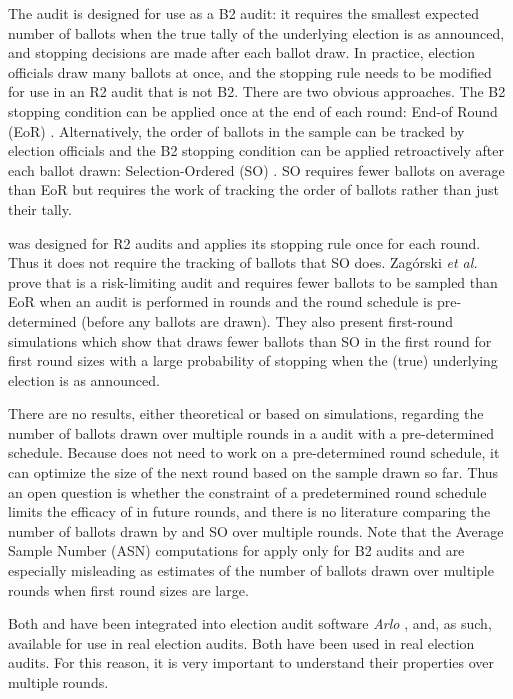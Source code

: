 The \BRAVO audit is designed for use as a B2 audit: it requires the smallest expected number of ballots when the true tally of the underlying election is as announced, and stopping decisions are made after each ballot draw. In practice, election officials draw many ballots at once, and the \BRAVO stopping rule needs to be modified for use in an R2 audit that is not B2. There are two obvious approaches. The B2 stopping condition can be applied once at the end of each round: End-of Round (EoR) \BRAVO.  Alternatively, the order of ballots in the sample can be tracked by election officials and the B2 \BRAVO stopping condition can be applied retroactively after each ballot drawn: Selection-Ordered (SO) \BRAVO. SO \BRAVO requires fewer ballots on average than EoR \BRAVO but requires the work of tracking the order of ballots rather than just their tally.

\Minerva was designed for R2 audits and applies its stopping rule once for each round. Thus it does not require the tracking of ballots that SO \BRAVO does. Zag{\'o}rski {\em et al.} \cite{usenix_minerva} prove that \Minerva is a risk-limiting audit and requires fewer ballots to be sampled than EoR \BRAVO when an audit is performed in rounds and the round schedule is pre-determined (before any ballots are drawn). They also present first-round simulations which show that \Minerva draws fewer ballots than SO \BRAVO in the first round for first round sizes with a large probability of stopping when the (true) underlying election is as announced. 

There are no results, either theoretical or based on simulations, regarding the number of ballots drawn over multiple rounds in a \Minerva audit with a pre-determined schedule. Because \BRAVO does not need to work on a pre-determined round schedule, it can optimize the size of the next round based on the sample drawn so far. Thus an open question is whether the constraint of a predetermined round schedule limits the efficacy of \Minerva in future rounds, and there is no literature comparing the number of ballots drawn by \Minerva and SO \BRAVO over multiple rounds. Note that the Average Sample Number (ASN) computations for \BRAVO \cite{bravo} apply only for B2 audits and are especially misleading as estimates of the number of ballots drawn over multiple rounds when first round sizes are large. 

Both \BRAVO and \Minerva have been integrated into election audit software {\em Arlo} \cite{arlo}, and, as such, available for use in real election audits. Both have been used in real election audits. For this reason, it is very important to understand their properties over multiple rounds. 

